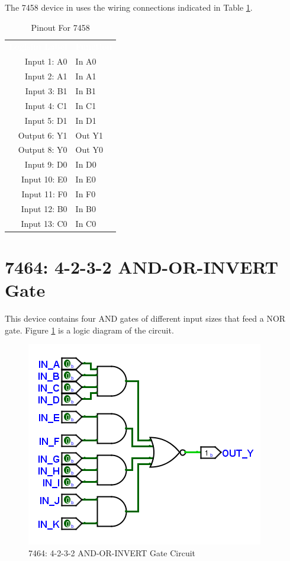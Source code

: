 The 7458 device in \LE uses the wiring connections indicated in Table \ref{tab:50-7458}.

\begin{table}[H]
	\sffamily
	\newcommand{\head}[1]{\textcolor{white}{\textbf{#1}}}		
	\begin{center}
		\begin{tabular}{rl} 
			\rowcolor{black!75}
			\head{Logisim Label} & \head{Function} \\
			Input 1: A0   & In A0  \\
			Input 2: A1   & In A1  \\
			Input 3: B1   & In B1  \\
			Input 4: C1   & In C1  \\
			Input 5: D1   & In D1  \\
			Output 6: Y1  & Out Y1 \\
			Output 8: Y0  & Out Y0 \\
			Input 9: D0   & In D0  \\
			Input 10: E0  & In E0 \\
			Input 11: F0  & In F0 \\
			Input 12: B0  & In B0 \\
			Input 13: C0  & In C0 \\
		\end{tabular}
	\end{center}
	\caption{Pinout For 7458}
	\label{tab:50-7458}
\end{table}

\section{7464: 4-2-3-2 AND-OR-INVERT Gate}

This device contains four AND gates of different input sizes that feed a NOR gate. Figure \ref{fig:app_ttl-7464} is a logic diagram of the circuit.

\begin{figure}[H]
	\centering
	\includegraphics{gfx/app_ttl-7464}
	\caption{7464: 4-2-3-2 AND-OR-INVERT Gate Circuit}
	\label{fig:app_ttl-7464}
\end{figure}

